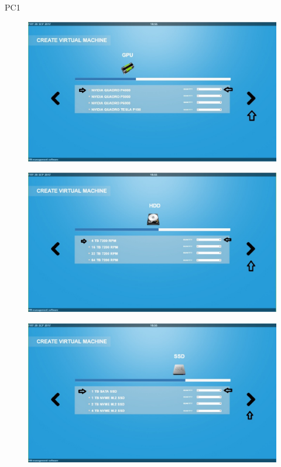 \begin{lyxlist}{PC1}
\begin{figure}[H]
\centering
\includegraphics[width=170mm]{images/createVMEx6.eps}
\caption{\label{overflow}}
\end{figure}

\begin{figure}[H]
\centering
\includegraphics[width=170mm]{images/createVMEx7.eps}
\caption{\label{overflow}}
\end{figure}

\begin{figure}[H]
\centering
\includegraphics[width=170mm]{images/createVMEx8.eps}
\caption{\label{overflow}}
\end{figure}


\end{lyxlist}
